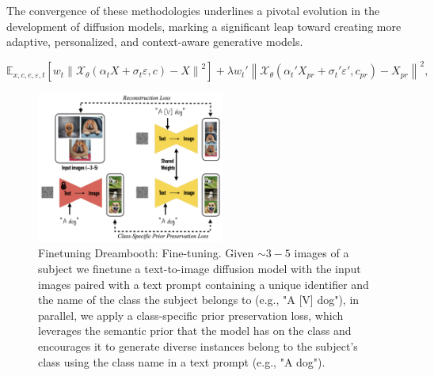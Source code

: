 The convergence of these methodologies underlines a pivotal evolution in the development of diffusion models, marking a significant leap toward creating more adaptive, personalized, and context-aware generative models.









\begin{equation} \label{eq:1}
    \mathbb{E}_{x,c,e,\varepsilon,t} \left[ w_t \left\| \mathcal{X}_\theta (\alpha_t X + \sigma_t \varepsilon, c) - X \right\|^2 \right] 
    + \lambda w_t' \left\| \mathcal{X}_\theta (\alpha_t' X_{pr} + \sigma_t' \varepsilon', c_{pr}) - X_{pr} \right\|^2,
    \end{equation}



\begin{figure}[H]
    \centering
    \includegraphics[width=0.55\textwidth]{images/dreambooth_training.png}
    \caption{Finetuning Dreambooth: Fine-tuning. Given $\sim 3-5$ images of a subject we finetune a text-to-image diffusion model with the input images paired
    with a text prompt containing a unique identifier and the name of
    the class the subject belongs to (e.g., "A [V] dog"), in parallel, we
    apply a class-specific prior preservation loss, which leverages the
    semantic prior that the model has on the class and encourages it to
    generate diverse instances belong to the subject's class using the class name in a text prompt (e.g., "A dog"). \cite*{dreambooth}}
\end{figure}
    

